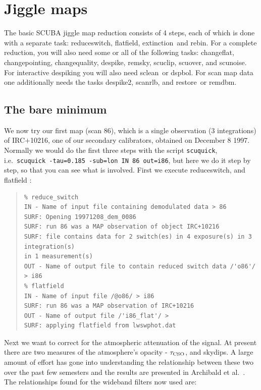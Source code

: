\documentclass[twoside,11pt]{article}
\newenvironment{myquote}{\begin{quote}\begin{small}}{\end{small}\end{quote}}
\newcommand{\task}[1]{\textsf{#1}}
\newcommand{\rebin}{\xref{\task{rebin}}{sun216}{REBIN}}
\newcommand{\remdbm}{\xref{\task{remdbm}}{sun216}{REMDBM}}
\newcommand{\chgqual}{\xref{\task{change\_\-qua\-lity}}{sun216}{CHANGE_QUALITY}}
\newcommand{\chgflat}{\xref{\task{change\_flat}}{sun216}{CHANGE_FLAT}}
\newcommand{\chgpnt}{\xref{\task{change\_pointing}}{sun216}{CHANGE_POINTING}}
\newcommand{\desp}{\xref{\task{despike}}{sun216}{DESPIKE}}
\newcommand{\dspbol}{\xref{\task{dspbol}}{sun216}{DSPBOL}}
\newcommand{\resw}{\xref{\task{reduce\_switch}}{sun216}{REDUCE_SWITCH}}
\newcommand{\flatf}{\xref{\task{flatfield}}{sun216}{FLATFIELD}}
\newcommand{\scanrlb}{\xref{\task{scan\_rlb}}{sun216}{SCAN_RLB}}
\newcommand{\ext}{\xref{\task{extinction}}{sun216}{EXTINCTION}}
\newcommand{\remsky}{\xref{\task{remsky}}{sun216}{REMSKY}}
\newcommand{\scuover}{\xref{\task{scuover}}{sun216}{SCUOVER}}
\newcommand{\restore}{\xref{\task{restore}}{sun216}{RESTORE}}
\newcommand{\scuclip}{\xref{\task{scuclip}}{sun216}{SCUCLIP}}
\newcommand{\scunoise}{\xref{\task{scunoise}}{sun216}{SCUNOISE}}
\newcommand{\sclean}{\xref{\task{sclean}}{sun86}{SCLEAN}}
\newcommand{\xref}[3]{#1}
\newcommand{\xlabel}[1]{}
\renewcommand{\_}{\texttt{\symbol{95}}}
\begin{document}
\section{\xlabel{Jiggle_maps}Jiggle maps}

The basic SCUBA jiggle map reduction consists of 4 steps, each of
which is done with a separate task: \resw, \flatf, \ext\ and \rebin.
For a complete reduction, you will also need some or all of the
following tasks: \chgflat, \chgpnt, \chgqual, \desp, \remsky,
\scuclip, \scuover, and \scunoise.  For interactive despiking you will
also need \sclean\ or \dspbol.  For scan map data one additionally
needs the tasks \desp2, \scanrlb, and \restore\ or \remdbm.

\subsection{\xlabel{The_bare_min}The bare minimum}

We now try our first map (scan 86), which is a single observation (3
integrations) of IRC$+$10216, one of our secondary calibrators,
obtained on December 8 1997.  Normally we would do the first three
steps with the script \texttt{scuquick}, i.e.\ \texttt{scuquick
-tau=0.185 -sub=lon IN 86 out=i86}, but here we do it step by step, so
that you can see what is involved.  First we execute \resw, and \flatf
:

\begin{myquote}
\begin{verbatim}
% reduce_switch
IN - Name of input file containing demodulated data > 86
SURF: Opening 19971208_dem_0086
SURF: run 86 was a MAP observation of object IRC+10216
SURF: file contains data for 2 switch(es) in 4 exposure(s) in 3
integration(s)
in 1 measurement(s)
OUT - Name of output file to contain reduced switch data /'o86'/ > i86
% flatfield
IN - Name of input file /@o86/ > i86
SURF: run 86 was a MAP observation of IRC+10216
OUT - Name of output file /'i86_flat'/ >
SURF: applying flatfield from lwswphot.dat
\end{verbatim}
\end{myquote}

Next we want to correct for the atmospheric attenuation of the signal.
At present there are two measures of the atmosphere's opacity -
$\tau_{\rm CSO}$, and skydips. A large amount of effort has gone into
understanding the relationship between these two over the past few
semesters and the results are presented in Archibald et al.\
\cite{Archibald00}.  The relationships found for the wideband filters
now
used are:
\end{document}
